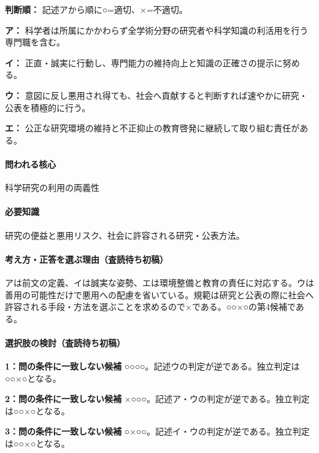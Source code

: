 \noindent\textbf{判断順：} 記述アから順に○=適切、×=不適切。\par

\noindent\textbf{ア：} 科学者は所属にかかわらず全学術分野の研究者や科学知識の利活用を行う専門職を含む。\par

\noindent\textbf{イ：} 正直・誠実に行動し、専門能力の維持向上と知識の正確さの提示に努める。\par

\noindent\textbf{ウ：} 意図に反し悪用され得ても、社会へ貢献すると判断すれば速やかに研究・公表を積極的に行う。\par

\noindent\textbf{エ：} 公正な研究環境の維持と不正抑止の教育啓発に継続して取り組む責任がある。\par

\paragraph{問われる核心} 科学研究の利用の両義性

\paragraph{必要知識} 研究の便益と悪用リスク、社会に許容される研究・公表方法。

\paragraph{考え方・正答を選ぶ理由（査読待ち初稿）} アは前文の定義、イは誠実な姿勢、エは環境整備と教育の責任に対応する。ウは善用の可能性だけで悪用への配慮を省いている。規範は研究と公表の際に社会へ許容される手段・方法を選ぶことを求めるので×である。○○×○の第4候補である。

\paragraph{選択肢の検討（査読待ち初稿）}\mbox{}\par

\noindent\textbf{1：問の条件に一致しない候補} ○○○○。記述ウの判定が逆である。独立判定は○○×○となる。\par

\noindent\textbf{2：問の条件に一致しない候補} ×○○○。記述ア・ウの判定が逆である。独立判定は○○×○となる。\par

\noindent\textbf{3：問の条件に一致しない候補} ○×○○。記述イ・ウの判定が逆である。独立判定は○○×○となる。\par

